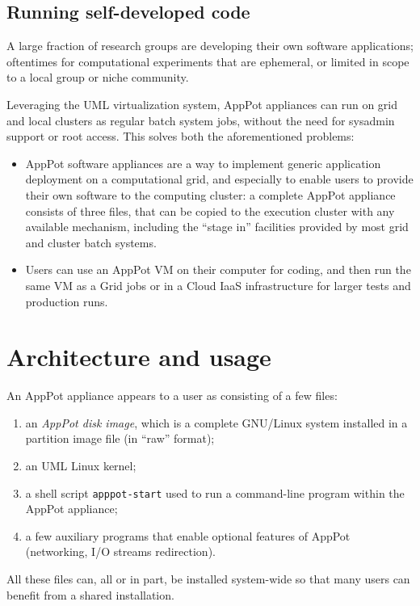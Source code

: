 \documentclass{PoS}
\begin{document}
\subsection{Running self-developed code}
\label{sec:usecase-development}

A large fraction of research groups are developing their own software
applications; oftentimes for computational experiments that are
ephemeral, or limited in scope to a local group or niche community.

Leveraging the \acl{UML} \cite{uml} virtualization system, AppPot
appliances can run on grid and local clusters as regular batch system
jobs, without the need for sysadmin support or root access.
This solves both the aforementioned problems:
\begin{itemize}
\item AppPot software appliances are a way to implement generic
  application deployment on a computational grid, and especially to
  enable users to provide their own software to the computing cluster:
  a complete AppPot appliance consists of three files, that can be
  copied to the execution cluster with any available mechanism,
  including the ``stage in'' facilities provided by most grid and
  cluster batch systems.
\item Users can use an AppPot \ac{VM} on their computer for coding,
  and then run the same \ac{VM} as a Grid jobs or in a Cloud \ac{IaaS}
  infrastructure for larger tests and production runs.
\end{itemize}

\section{Architecture and usage}
\label{sec:architecture}

An AppPot appliance appears to a user as consisting of a few files:
\begin{enumerate}
\item an \emph{AppPot disk image}, which is a complete GNU/Linux system
  installed in a partition image file (in ``raw'' format);
\item an \acs{UML} Linux kernel;
\item a shell script \texttt{apppot-start} used to run a command-line
  program within the AppPot appliance;
\item a few auxiliary programs that enable optional features of
  AppPot (networking, I/O streams redirection).
\end{enumerate}
All these files can, all or in part, be installed system-wide so that many
users can benefit from a shared installation.
\end{document}
